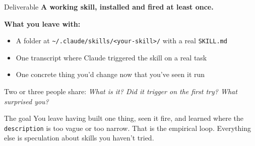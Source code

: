 \documentclass[aspectratio=169, 11pt]{beamer}
\begin{document}
\begin{frame}[fragile]{Deliverable}
  \textbf{A working skill, installed and fired at least once.}

  \vspace{0.5em}
  \textbf{What you leave with:}
  \begin{itemize}
    \item A folder at \texttt{\textasciitilde/.claude/skills/<your-skill>/} with a real \texttt{SKILL.md}
    \item One transcript where Claude triggered the skill on a real task
    \item One concrete thing you'd change now that you've seen it run
  \end{itemize}

  \vspace{0.5em}
  Two or three people share: \emph{What is it? Did it trigger on the first try? What surprised you?}

  \vspace{0.5em}
  \begin{alertblock}{The goal}
    You leave having built one thing, seen it fire, and learned where the \texttt{description} is too vague or too narrow. That is the empirical loop. Everything else is speculation about skills you haven't tried.
  \end{alertblock}
\end{frame}



\end{document}
